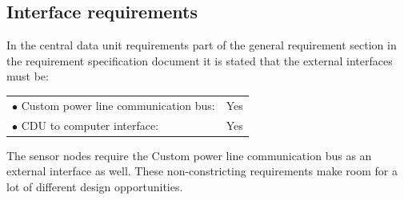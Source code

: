 \subsection{Interface requirements}
In the central data unit requirements part of the general requirement section in the requirement specification document it is stated that the external interfaces must be:
\begin{table}[H]
	\begin{tabular}{p{8cm} p{2cm}}
	$\bullet$ Custom power line communication bus: & Yes\\
	$\bullet$ CDU to computer interface: & Yes\\
	\end{tabular}
\end{table}
The sensor nodes require the Custom power line communication bus as an external interface as well. These non-constricting requirements make room for a lot of different design opportunities.
